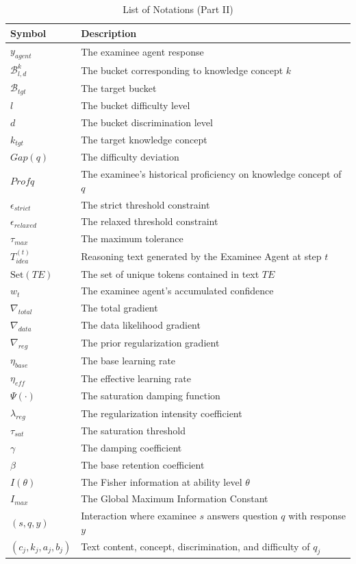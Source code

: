 \begin{table}[!htbp] %
\centering
\caption{List of Notations (Part II)}
\label{tab:notations_part2}
\begin{tabularx}{\columnwidth}{lX}
\toprule
\textbf{Symbol} & \textbf{Description} \\ \midrule
$y_{agent}$ & The examinee agent response \\
$\mathcal{B}_{l,d}^k$ & The bucket corresponding to knowledge concept $k$ \\
$\mathcal{B}_{tgt}$ & The target bucket \\
$l$ & The bucket difficulty level \\
$d$ & The bucket discrimination level \\
$k_{tgt}$ & The target knowledge concept \\
$Gap(q)$ & The difficulty deviation \\
$Profq$ & The examinee's historical proficiency on knowledge concept of $q$ \\
$\epsilon_{strict}$ & The strict threshold constraint \\
$\epsilon_{relaxed}$ & The relaxed threshold constraint \\
$\tau_{max}$ & The maximum tolerance \\
$T^{(t)}_{idea}$ & Reasoning text generated by the Examinee Agent at step $t$ \\
$\text{Set}(TE)$ & The set of unique tokens contained in text $TE$ \\
$w_t$ & The examinee agent's accumulated confidence \\
$\nabla_{total}$ & The total gradient \\
$\nabla_{data}$ & The data likelihood gradient \\
$\nabla_{reg}$ & The prior regularization gradient \\
$\eta_{base}$ & The base learning rate \\
$\eta_{eff}$ & The effective learning rate \\
$\Psi(\cdot)$ & The saturation damping function \\
$\lambda_{reg}$ & The regularization intensity coefficient \\
$\tau_{sat}$ & The saturation threshold \\
$\gamma$ & The damping coefficient \\
$\beta$ & The base retention coefficient \\
$I(\theta)$ & The Fisher information at ability level $\theta$ \\
$I_{max}$ & The Global Maximum Information Constant \\
$(s, q, y)$ & Interaction where examinee $s$ answers question $q$ with response $y$ \\
$(c_j, k_j, a_j, b_j)$ & Text content, concept, discrimination, and difficulty of $q_j$ \\ \bottomrule
\end{tabularx}
\end{table}